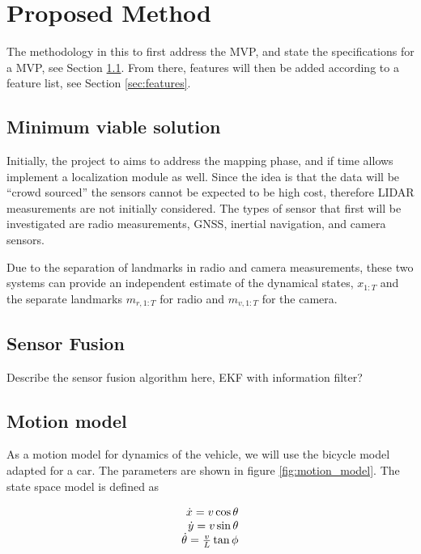 \section{Proposed Method}

The methodology in this to first address the \gls{MVP}, and state the  
specifications for a \gls{MVP}, see Section \ref{sec:mvs}. From there, features 
will then be added 
according to a feature list, see Section \ref{sec:features}.

\subsection{Minimum viable solution}\label{sec:mvs}

Initially, the project to aims to address the mapping phase, and if time allows 
implement a localization module as well. Since the idea is that the data will 
be ``crowd sourced'' the sensors cannot be expected to be high cost, therefore 
\gls{LIDAR} measurements are not initially considered. The types of sensor that 
first will be investigated are radio measurements, \gls{GNSS}, inertial 
navigation, and camera sensors.

Due to the separation of landmarks in radio and camera measurements, these two 
systems can provide an independent estimate of the dynamical states, $x_{1:T}$ 
and the separate landmarks $m_{r,1:T}$ for radio and $m_{v,1:T}$ for the 
camera. 

\subsection{Sensor Fusion}

Describe the sensor fusion algorithm here, EKF with information filter?

\subsection{Motion model}

As a motion model for dynamics of the vehicle, we will use the bicycle model 
adapted for a 
car.
The parameters are shown in figure \ref{fig:motion_model}. The state space 
model is defined as

\begin{equation}
 \begin{array}[b]{r}
  \dot{x}  = v \cos \theta \\
  \dot{y}  = v \sin \theta \\
  \dot{\theta}  = \frac{v}{L} \tan{\phi}
 \end{array}
\end{equation}

